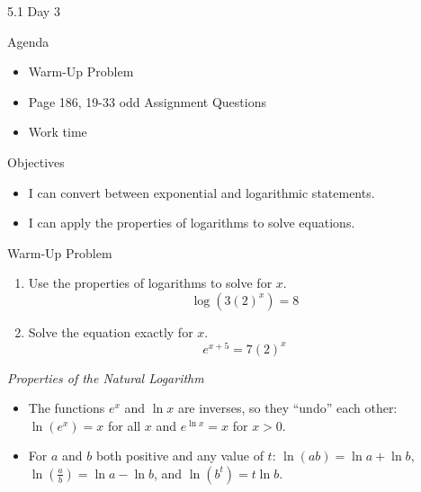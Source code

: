 \documentclass[ignorenonframetext,]{beamer}
\providecommand{\tightlist}{%
  \setlength{\itemsep}{0pt}\setlength{\parskip}{0pt}}
\begin{document}
\begin{frame}{5.1 Day 3}

\begin{block}{Agenda}

\begin{itemize}
\tightlist
\item
  Warm-Up Problem
\item
  Page 186, 19-33 odd Assignment Questions
\item
  Work time
\end{itemize}

\end{block}

\begin{block}{Objectives}

\begin{itemize}
\tightlist
\item
  I can convert between exponential and logarithmic statements.
\item
  I can apply the properties of logarithms to solve equations.
\end{itemize}

\end{block}

\end{frame}

\begin{frame}{Warm-Up Problem}

\begin{enumerate}
\def\labelenumi{\arabic{enumi}.}
\item
  Use the properties of logarithms to solve for \(x\).
  \[\log(3(2)^x) = 8\]
\item
  Solve the equation exactly for \(x\). \[e^{x+5} = 7(2)^x\]
\end{enumerate}

\emph{Properties of the Natural Logarithm}

\begin{itemize}
\tightlist
\item
  The functions \(e^x\) and \(\ln x\) are inverses, so they ``undo''
  each other: \(\ln(e^x) = x\) for all \(x\) and \(e^{\ln x} = x\) for
  \(x > 0\).
\item
  For \(a\) and \(b\) both positive and any value of \(t\):
  \(\ln (ab) = \ln a + \ln b\),
  \(\ln \left(\frac{a}{b}\right) = \ln a - \ln b\), and
  \(\ln (b^t) = t\ln b\).
\end{itemize}

\end{frame}
\end{document}
